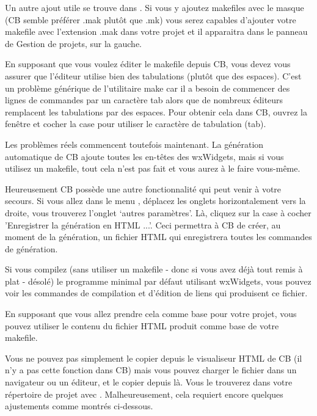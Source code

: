 Un autre ajout utile se trouve dans . Si vous y ajoutez makefiles avec le masque  (CB semble préférer .mak plutôt que .mk) vous serez capables d'ajouter votre makefile avec l'extension .mak dans votre projet et il apparaitra dans le panneau de Gestion de projets, sur la gauche.

En supposant que vous voulez éditer le makefile depuis CB, vous devez vous assurer que l'éditeur utilise bien des tabulations (plutôt que des espaces). C'est un problème générique de l'utilitaire make car il a besoin de commencer des lignes de commandes par un caractère tab alors que de nombreux éditeurs remplacent les tabulations par des espaces. Pour obtenir cela dans CB, ouvrez la fenêtre  et cocher la case pour utiliser le caractère de tabulation (tab).

Les problèmes réels commencent toutefois maintenant. La génération automatique de CB ajoute toutes les en-têtes des wxWidgets, mais si vous utilisez un makefile, tout cela n'est pas fait et vous aurez à le faire vous-même.

Heureusement CB possède une autre fonctionnalité qui peut venir à votre secours. Si vous allez dans le menu , déplacez les onglets horizontalement vers la droite, vous trouverez l'onglet ‘autres paramètres’. Là, cliquez sur la case à cocher  'Enregistrer la génération en HTML ...'. Ceci permettra à CB de créer, au moment de la génération, un fichier HTML qui enregistrera toutes les commandes de génération.


Si vous compilez (sans utiliser un makefile - donc si vous avez déjà tout remis à plat - désolé) le programme minimal par défaut utilisant wxWidgets, vous pouvez voir les commandes de compilation et d'édition de liens qui produisent ce fichier.

En supposant que vous allez prendre cela comme base pour votre projet, vous pouvez utiliser le contenu du fichier HTML produit comme base de votre makefile.

Vous ne pouvez pas simplement le copier depuis le visualiseur HTML de CB (il n'y a pas cette fonction dans CB) mais vous pouvez charger le fichier dans un navigateur ou un éditeur, et le copier depuis là. Vous le trouverez dans votre répertoire de projet avec . Malheureusement, cela requiert encore quelques ajustements comme montrés ci-dessous.

